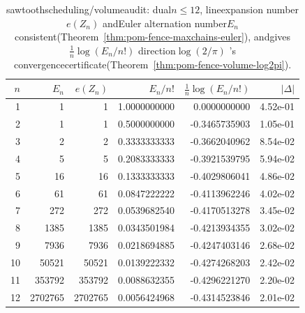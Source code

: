\begin{table}[H]
\centering
\scriptsize
\setlength{\tabcolsep}{6pt}
\caption{sawtoothscheduling/volumeaudit: dual$n\le 12$, lineexpansion number$e(Z_n)$ andEuler alternation number$E_n$ consistent(Theorem~\ref{thm:pom-fence-maxchains-euler}), andgives$\frac{1}{n}\log(E_n/n!)$ direction$\log(2/\pi)$ 's convergencecertificate(Theorem~\ref{thm:pom-fence-volume-log2pi}). }
\label{tab:fence_scheduling_euler_volume_audit}
\begin{tabular}{r r r r r r}
\toprule
$n$ & $E_n$ & $e(Z_n)$ & $E_n/n!$ & $\frac{1}{n}\log(E_n/n!)$ & $|\Delta|$\\
\midrule
1 & 1 & 1 & 1.0000000000 & 0.0000000000 & 4.52e-01\\
2 & 1 & 1 & 0.5000000000 & -0.3465735903 & 1.05e-01\\
3 & 2 & 2 & 0.3333333333 & -0.3662040962 & 8.54e-02\\
4 & 5 & 5 & 0.2083333333 & -0.3921539795 & 5.94e-02\\
5 & 16 & 16 & 0.1333333333 & -0.4029806041 & 4.86e-02\\
6 & 61 & 61 & 0.0847222222 & -0.4113962246 & 4.02e-02\\
7 & 272 & 272 & 0.0539682540 & -0.4170513278 & 3.45e-02\\
8 & 1385 & 1385 & 0.0343501984 & -0.4213934355 & 3.02e-02\\
9 & 7936 & 7936 & 0.0218694885 & -0.4247403146 & 2.68e-02\\
10 & 50521 & 50521 & 0.0139222332 & -0.4274268203 & 2.42e-02\\
11 & 353792 & 353792 & 0.0088632355 & -0.4296221270 & 2.20e-02\\
12 & 2702765 & 2702765 & 0.0056424968 & -0.4314523846 & 2.01e-02\\
\bottomrule
\end{tabular}
\end{table}

